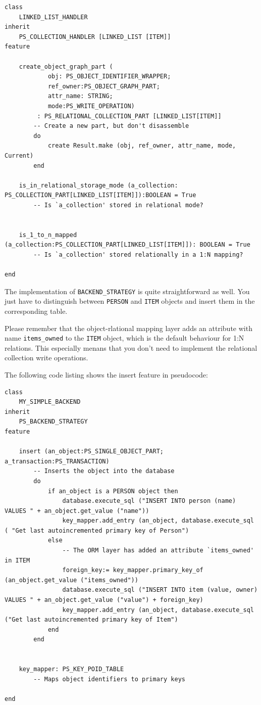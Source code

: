 \begin{lstlisting}[language=OOSC2Eiffel, captionpos=b, caption={The collection handler for LINKED\_LIST}, label={lst:my_linked_list_collection_handler}]
class 
	LINKED_LIST_HANDLER
inherit
	PS_COLLECTION_HANDLER [LINKED_LIST [ITEM]]
feature

	create_object_graph_part (
			obj: PS_OBJECT_IDENTIFIER_WRAPPER;
			ref_owner:PS_OBJECT_GRAPH_PART; 
			attr_name: STRING;
			mode:PS_WRITE_OPERATION)
		 : PS_RELATIONAL_COLLECTION_PART [LINKED_LIST[ITEM]]
		-- Create a new part, but don't disassemble
		do
			create Result.make (obj, ref_owner, attr_name, mode, Current)
		end

	is_in_relational_storage_mode (a_collection: PS_COLLECTION_PART[LINKED_LIST[ITEM]]):BOOLEAN = True
		-- Is `a_collection' stored in relational mode?


	is_1_to_n_mapped (a_collection:PS_COLLECTION_PART[LINKED_LIST[ITEM]]): BOOLEAN = True
		-- Is `a_collection' stored relationally in a 1:N mapping?

end
\end{lstlisting}


The implementation of \lstinline!BACKEND_STRATEGY! is quite straightforward as well.
You just have to distinguish between \lstinline!PERSON! and \lstinline!ITEM! objects and insert them in the corresponding table.

Please remember that the object-rlational mapping layer adds an attribute with name \lstinline!items_owned! to the \lstinline!ITEM! object, which is the default behaviour for 1:N relations.
This especially menans that you don't need to implement the relational collection write operations.

The following code listing shows the insert feature in pseudocode:

\begin{lstlisting}[language=OOSC2Eiffel, captionpos=b, caption={The collection handler for LINKED\_LIST}, label={lst:my_backend_adaption}]
class 
	MY_SIMPLE_BACKEND
inherit
	PS_BACKEND_STRATEGY
feature

	insert (an_object:PS_SINGLE_OBJECT_PART; a_transaction:PS_TRANSACTION)
		-- Inserts the object into the database
		do
			if an_object is a PERSON object then
				database.execute_sql ("INSERT INTO person (name) VALUES " + an_object.get_value ("name"))
				key_mapper.add_entry (an_object, database.execute_sql ( "Get last autoincremented primary key of Person")
			else
				-- The ORM layer has added an attribute `items_owned' in ITEM
				foreign_key:= key_mapper.primary_key_of (an_object.get_value ("items_owned"))
				database.execute_sql ("INSERT INTO item (value, owner) VALUES " + an_object.get_value ("value") + foreign_key)
				key_mapper.add_entry (an_object, database.execute_sql ("Get last autoincremented primary key of Item")
			end
		end


	key_mapper: PS_KEY_POID_TABLE
		-- Maps object identifiers to primary keys

end
\end{lstlisting}

